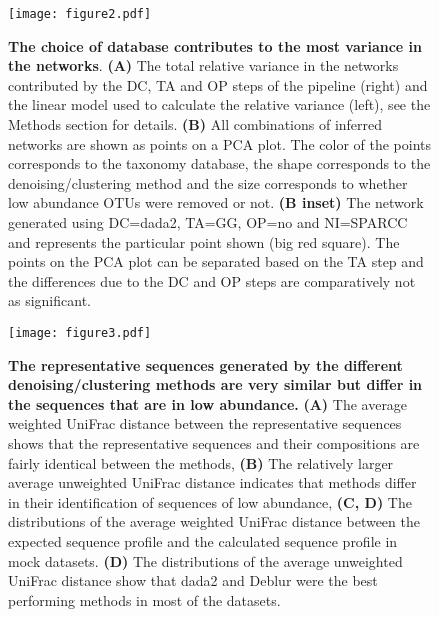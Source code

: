   \begin{figure}[H]
    \centering
    \texttt{[image: figure2.pdf]}
  \end{figure}
  \begin{figure}[H]
    \centering
      \caption{
      \textbf{The choice of database contributes to the most variance in the networks}.
      \textbf{(A)} The total relative variance in the networks contributed by the DC, TA and OP steps of the pipeline (right) and the linear model used to calculate the relative variance (left), see the Methods section for details.
      \textbf{(B)} All combinations of inferred networks are shown as points on a PCA plot.
      The color of the points corresponds to the taxonomy database, the shape corresponds to the denoising/clustering method and the size corresponds to whether low abundance OTUs were removed or not.
      \textbf{(B inset)} The network generated using DC=dada2, TA=GG, OP=no and NI=SPARCC and represents the particular point shown (big red square).
      The points on the PCA plot can be separated based on the TA step and the differences due to the DC and OP steps are comparatively not as significant.
    }
    \label{fig:figure2}
  \end{figure}
  \FloatBarrier
  \newpage

  \begin{figure}
    \centering
    \texttt{[image: figure3.pdf]}
    \caption{
      \textbf{The representative sequences generated by the different denoising/clustering methods are very similar but differ in the sequences that are in low abundance.}
      \textbf{(A)} The average weighted UniFrac distance between the representative sequences shows that the representative sequences and their compositions are fairly identical between the methods,
      \textbf{(B)} The relatively larger average unweighted UniFrac distance indicates that methods differ in their identification of sequences of low abundance,
      \textbf{(C, D)} The distributions of the average weighted UniFrac distance between the expected sequence profile and the calculated sequence profile in mock datasets.
      \textbf{(D)} The distributions of the average unweighted UniFrac distance show that dada2 and Deblur were the best performing methods in most of the datasets.
    }
    \label{fig:figure3}
  \end{figure}
  \FloatBarrier
  \newpage

